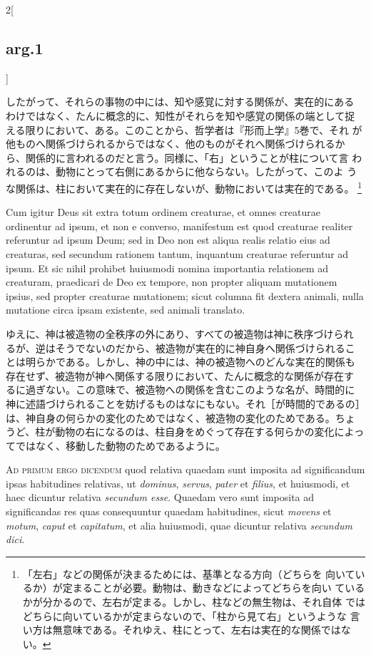 \documentclass[paper=a4paper,fontsize=10pt,jafontsize=9pt,titlepage]{jlreq}
\begin{document}
\begin{paracol}{2}[\subsection{arg.1}]
\switchcolumn

したがって、それらの事物の中には、知や感覚に対する関係が、実在的にある
わけではなく、たんに概念的に、知性がそれらを知や感覚の関係の端として捉
える限りにおいて、ある。このことから、哲学者は『形而上学』5巻で、それ
が他ものへ関係づけられるからではなく、他のものがそれへ関係づけられるか
ら、関係的に言われるのだと言う。同様に、「右」ということが柱について言
われるのは、動物にとって右側にあるからに他ならない。したがって、このよ
うな関係は、柱において実在的に存在しないが、動物においては実在的である。
\footnote{「左右」などの関係が決まるためには、基準となる方向（どちらを
向いているか）が定まることが必要。動物は、動きなどによってどちらを向い
ているかが分かるので、左右が定まる。しかし、柱などの無生物は、それ自体
ではどちらに向いているかが定まらないので、「柱から見て右」というような
言い方は無意味である。それゆえ、柱にとって、左右は実在的な関係ではない。}

\switchcolumn*

Cum igitur Deus sit extra totum ordinem creaturae, et omnes creaturae
ordinentur ad ipsum, et non e converso, manifestum est quod creaturae
realiter referuntur ad ipsum Deum; sed in Deo non est aliqua realis
relatio eius ad creaturas, sed secundum rationem tantum, inquantum
creaturae referuntur ad ipsum. Et sic nihil prohibet huiusmodi nomina
importantia relationem ad creaturam, praedicari de Deo ex tempore, non
propter aliquam mutationem ipsius, sed propter creaturae mutationem;
sicut columna fit dextera animali, nulla mutatione circa ipsam
existente, sed animali translato.

\switchcolumn

ゆえに、神は被造物の全秩序の外にあり、すべての被造物は神に秩序づけられ
るが、逆はそうでないのだから、被造物が実在的に神自身へ関係づけられるこ
とは明らかである。しかし、神の中には、神の被造物へのどんな実在的関係も
存在せず、被造物が神へ関係する限りにおいて、たんに概念的な関係が存在す
るに過ぎない。この意味で、被造物への関係を含むこのような名が、時間的に
神に述語づけられることを妨げるものはなにもない。それ［が時間的であるの］
は、神自身の何らかの変化のためではなく、被造物の変化のためである。ちょ
うど、柱が動物の右になるのは、柱自身をめぐって存在する何らかの変化によっ
てではなく、移動した動物のためであるように。

\switchcolumn*[\subsection{ad.1}]

{\scshape Ad primum ergo dicendum} quod relativa quaedam sunt imposita
ad significandum ipsas habitudines relativas, ut {\itshape dominus},
{\itshape servus}, {\itshape pater} et {\itshape filius}, et
huiusmodi, et haec dicuntur relativa {\itshape secundum esse}. Quaedam
vero sunt imposita ad significandas res quas consequuntur quaedam
habitudines, sicut {\itshape movens} et {\itshape motum}, {\itshape
caput} et {\itshape capitatum}, et alia huiusmodi, quae dicuntur
relativa {\itshape secundum dici}.


\end{paracol}
\end{document}
